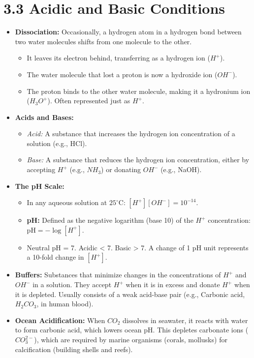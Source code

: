 \documentclass[11pt, a4paper]{article}
\begin{document}
\section*{3.3 Acidic and Basic Conditions}
\begin{itemize}
    \item \textbf{Dissociation:} Occasionally, a hydrogen atom in a hydrogen bond between two water molecules shifts from one molecule to the other.
    \begin{itemize}
        \item It leaves its electron behind, transferring as a hydrogen ion ($H^+$).
        \item The water molecule that lost a proton is now a hydroxide ion ($OH^-$).
        \item The proton binds to the other water molecule, making it a hydronium ion ($H_3O^+$). Often represented just as $H^+$.
    \end{itemize}
    \item \textbf{Acids and Bases:}
    \begin{itemize}
        \item \textit{Acid:} A substance that increases the hydrogen ion concentration of a solution (e.g., HCl).
        \item \textit{Base:} A substance that reduces the hydrogen ion concentration, either by accepting $H^+$ (e.g., $NH_3$) or donating $OH^-$ (e.g., NaOH).
    \end{itemize}
    \item \textbf{The pH Scale:}
    \begin{itemize}
        \item In any aqueous solution at $25^\circ\text{C}$: $[H^+][OH^-] = 10^{-14}$.
        \item \textbf{pH:} Defined as the negative logarithm (base 10) of the $H^+$ concentration: $\text{pH} = -\log[H^+]$.
        \item Neutral pH = 7. Acidic < 7. Basic > 7. A change of 1 pH unit represents a 10-fold change in $[H^+]$.
    \end{itemize}
    \item \textbf{Buffers:} Substances that minimize changes in the concentrations of $H^+$ and $OH^-$ in a solution. They accept $H^+$ when it is in excess and donate $H^+$ when it is depleted. Usually consists of a weak acid-base pair (e.g., Carbonic acid, $H_2CO_3$, in human blood).
    \item \textbf{Ocean Acidification:} When $CO_2$ dissolves in seawater, it reacts with water to form carbonic acid, which lowers ocean pH. This depletes carbonate ions ($CO_3^{2-}$), which are required by marine organisms (corals, mollusks) for calcification (building shells and reefs).
\end{itemize}
\end{document}
